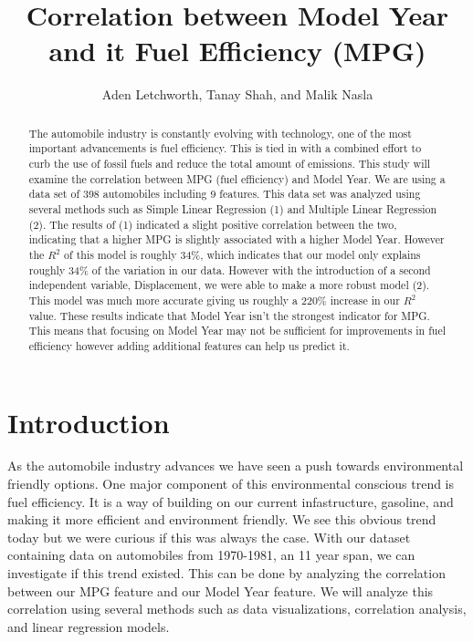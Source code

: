 \documentclass[journal]{IEEEtran}
\title{Correlation between Model Year and it Fuel Efficiency
(MPG)}
\author{Aden Letchworth, Tanay Shah, and Malik Nasla}
\begin{document}
\maketitle

\begin{abstract}
The automobile industry is constantly evolving with technology, 
one of the most important advancements is fuel efficiency. 
This is tied in with a combined effort to curb the use of fossil fuels and reduce the total amount of emissions. 
This study will examine the correlation between MPG (fuel efficiency) and Model Year. 
We are using a data set of 398 automobiles including 9 features. 
This data set was analyzed using several methods such as Simple Linear Regression (1) and Multiple Linear Regression (2). 
The results of (1) indicated a slight positive correlation between the two, indicating that a higher MPG is slightly associated with a higher Model Year. 
However the $R^{2}$ of this model is roughly 34\%, which indicates that our model only explains roughly 34\% of the variation in our data. 
However with the introduction of a second independent variable, Displacement, we were able to make a more robust model (2). 
This model was much more accurate giving us roughly a 220\% increase in our $R^{2}$ value.
These results indicate that Model Year isn't the strongest indicator for MPG. 
This means that focusing on Model Year may not be sufficient for improvements in fuel efficiency however adding additional features can help us predict it.
\end{abstract}

\section{Introduction}
As the automobile industry advances we have seen a push towards environmental friendly options.
One major component of this environmental conscious trend is fuel efficiency. 
It is a way of building on our current infastructure, gasoline, and making it more efficient and environment friendly. 
We see this obvious trend today but we were curious if this was always the case. 
With our dataset containing data on automobiles from 1970-1981, an 11 year span, we can investigate if this trend existed. 
This can be done by analyzing the correlation between our MPG feature and our Model Year feature. 
We will analyze this correlation using several methods such as data visualizations, correlation analysis, and linear regression models.
\end{document}
